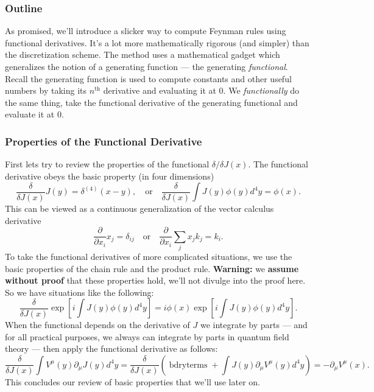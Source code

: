 \subsubsection{Outline}
As promised, we'll introduce a slicker way to compute Feynman
rules using functional derivatives. It's a lot more
mathematically rigorous (and simpler) than the discretization
scheme. The method uses a mathematical gadget which generalizes
the notion of a generating function --- the generating
\emph{functional}. Recall the generating function is used to
compute constants and other useful numbers by taking its
$n^{\text{th}}$ derivative and evaluating it at 0. We
\emph{functionally} do the same thing, take the functional
derivative of the generating functional and evaluate it at 0.


\subsubsection{Properties of the Functional Derivative}
First lets try to review the properties of the functional
$\delta/\delta J(x)$. The functional derivative obeys the basic
property (in four dimensions)
\begin{equation}%
\frac{\delta}{\delta J(x)}J(y)=\delta^{(4)}(x-y),
\quad\text{or}\quad
\frac{\delta}{\delta J(x)}\int J(y)\phi(y)d^{4}y = \phi(x).
\end{equation}
This can be viewed as a continuous generalization of the vector
calculus derivative 
\begin{equation}%
\frac{\partial}{\partial x_i}x_j = \delta_{ij}
\quad\text{or}\quad
\frac{\partial}{\partial x_i}\sum_{j}x_{j}k_{j}=k_{i}.
\end{equation}
To take the functional derivatives of more complicated
situations, we use the basic properties of the chain rule and the
product rule. \textbf{Warning:} we \textbf{assume without proof}
that these properties hold, we'll not divulge into the proof
here. So we have situations like the following:
\begin{equation}%
\frac{\delta}{\delta J(x)}\exp\left[i\int J(y)\phi(y)d^{4}y\right]
=i\phi(x)\exp\left[i\int J(y)\phi(y)d^{4}y\right].
\end{equation}
When the functional depends on the derivative of $J$ we integrate
by parts --- and for all practical purposes, we always can
integrate by parts in quantum field theory --- then apply the
functional derivative as follows:
\begin{equation}%
\frac{\delta}{\delta J(x)}\int V^{\mu}(y)\partial_{\mu}J(y)d^{4}y
=
\frac{\delta}{\delta J(x)}\left(
\operatorname{bdry terms} + 
\int J(y)\partial_{\mu}V^{\mu}(y)d^{4}y
\right)
= - \partial_{\mu}V^{\mu}(x).
\end{equation}
This concludes our review of basic properties that we'll use
later on.

